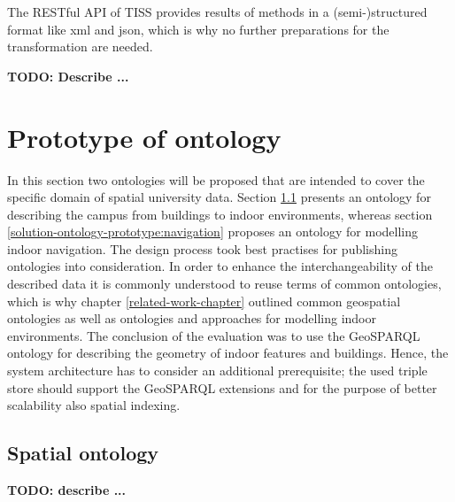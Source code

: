 \documentclass[draft,final]{vutinfth} %
\newcommand{\todo}[1]{{\color{red}\textbf{TODO: {#1}}}} %
\begin{document}
The RESTful API of TISS provides results of methods in a (semi-)structured format like \gls{xml} and \gls{json}, which is why no further preparations for the transformation are needed. 

\todo{Describe ... }

\section{Prototype of ontology}
\label{solution-ontology-prototype}
In this section two ontologies will be proposed that are intended to cover the specific domain of spatial university data. Section \ref{solution-ontology-prototype:spatial} presents an ontology for describing the campus from buildings to indoor environments, whereas section \ref{solution-ontology-prototype:navigation} proposes an ontology for modelling indoor navigation. The design process took best practises for publishing ontologies\cite{berrueta_best_2008} into consideration. In order to enhance the interchangeability of the described data it is commonly understood to reuse terms of common ontologies, which is why chapter \ref{related-work-chapter} outlined common geospatial ontologies as well as ontologies and approaches for modelling indoor environments. The conclusion of the evaluation was to use the GeoSPARQL ontology for describing the geometry of indoor features and buildings. Hence, the system architecture has to consider an additional prerequisite; the used triple store should support the GeoSPARQL extensions and for the purpose of better scalability also spatial indexing.

\subsection{Spatial ontology}
\label{solution-ontology-prototype:spatial}

\todo{describe ... }
\end{document}
